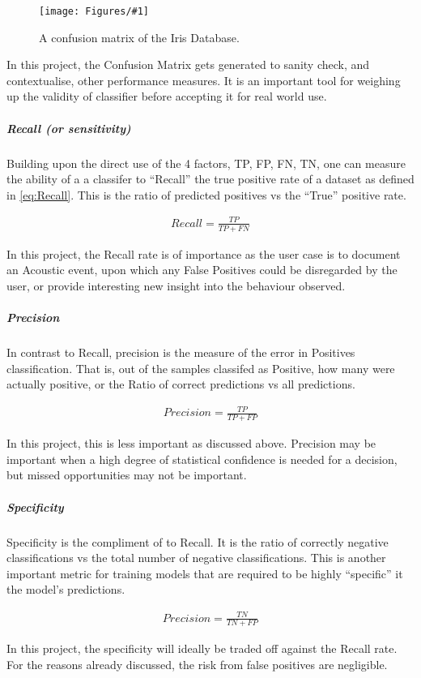 \documentclass{UoNMCHA}
\newcommand{\inlineQuote}[1]{``#1''}
\newcommand{\fFigure}[3]{
	\begin{figure}[h]
        \begin{center}  
            \texttt{[image: Figures/\#1]}  
            \caption{#2}
            \label{#1}
        \end{center}
	\end{figure}
}
\numberwithin{equation}{section}
\begin{document}
\fFigure{confusion_matrix.png}{A confusion matrix of the Iris Database.\cite{scikitlearnConMatrix}}{0.6}

In this project, the Confusion Matrix gets generated to sanity check, and contextualise, other performance measures. It is an important tool for weighing up the validity of classifier before accepting it for real world use.

\subparagraph{Recall (or sensitivity)}

Building upon the direct use of the 4 factors, TP, FP, FN, TN, one can measure the ability of a a classifer to \inlineQuote{Recall} the true positive rate of a dataset as defined in \ref{eq:Recall}.
This is the ratio of predicted positives vs the \inlineQuote{True} positive rate.

\begin{gather}\label{eq:Recall}
    Recall = \frac{TP}{TP+FN}
\end{gather}

In this project, the Recall rate is of importance as the user case is to document an Acoustic event, upon which any False Positives could be disregarded by the user, or provide interesting new insight into the behaviour observed.

\subparagraph{Precision}
In contrast to Recall, precision is the measure of the error in Positives classification. That is, out of the samples classifed as Positive, how many were actually positive, or the Ratio of correct predictions vs all predictions.

\begin{gather}\label{eq:Precision}
    Precision = \frac{TP}{TP+FP}
\end{gather}

In this project, this is less important as discussed above. Precision may be important when a high degree of statistical confidence is needed for a decision, but missed opportunities may not be important. 

\subparagraph{Specificity}
Specificity is the compliment of to Recall. It is the ratio of correctly negative classifications vs the total number of negative classifications. This is another important metric for training models that are required to be highly \inlineQuote{specific} it the model's predictions.

\begin{gather}\label{eq:Specificity}
    Precision = \frac{TN}{TN+FP}
\end{gather}

In this project, the specificity will ideally be traded off against the Recall rate. For the reasons already discussed, the risk from false positives are negligible. 
\end{document}
